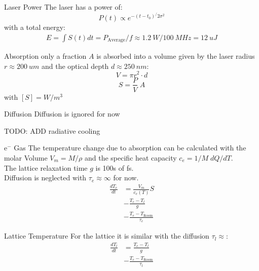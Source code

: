 \begin{frame}{Laser Power}
	The laser has a power of:
	$$P(t) \propto e^{-(t-t_0)^ / 2\sigma^2}$$
	with a total energy:
	\begin{align*}
		E = \int S(t) dt = P_\text{Average} / f \approx \SI{1.2}{W} / \SI{100}{MHz} = \SI{12}{uJ}
	\end{align*}
\end{frame}

\begin{frame}{Absorption}
	only a fraction $A$ is absorbed into a volume given by the laser radius $r\approx \SI{200}{um}$ and the optical depth $d\approx \SI{250}{nm}$:
	$$V=\pi r^2 \cdot d$$
	$$S = \frac{P}{V}\; A$$
	with $[S] = W/m^3$  
\end{frame}

\begin{frame}{Diffusion}
	Diffusion is ignored for now

	TODO: ADD radiative cooling
\end{frame}

\begin{frame}{e$^-$ Gas}
	The temperature change due to absorption can be calculated with the molar Volume $V_m = M / \rho$ and  the specific heat capacity $c_e= 1/M \; dQ/dT$.\\
	The lattice relaxation time $g$ is 100s of \si{fs}.\\
	Diffusion is neglected with $\tau_e\approx\infty$ for now.
	\begin{align*}
		\frac{dT_e}{dt}
		&= \frac{V_m}{c_e(T)}S\\
		&- \frac{T_e - T_l}{g}\\ 
		&- \frac{T_e - T_\text{Room}}{\tau_e}
	\end{align*}
\end{frame}

\begin{frame}{Lattice Temperature}
	For the lattice it is similar with the diffusion $\tau_l\approx$:
	\begin{align*}
		\frac{dT_l}{dt}
		&= \frac{T_e - T_l}{g}\\ 
		&- \frac{T_e - T_\text{Room}}{\tau_l}
	\end{align*}
\end{frame}